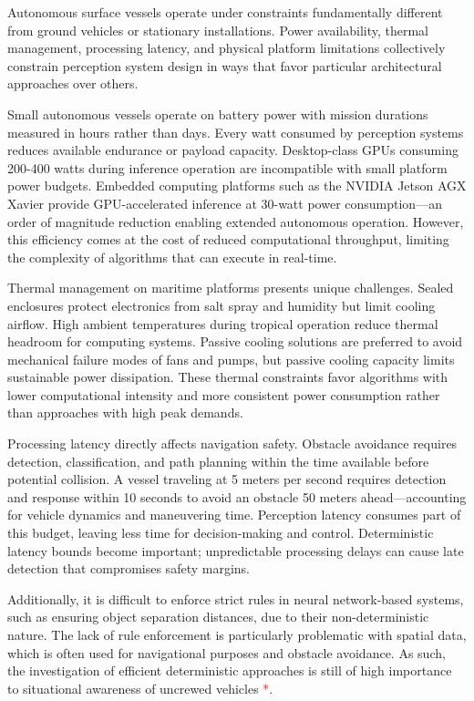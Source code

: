 \documentclass[../main.tex]{subfiles}
\begin{document}
Autonomous surface vessels operate under constraints fundamentally different from ground vehicles or stationary installations. Power availability, thermal management, processing latency, and physical platform limitations collectively constrain perception system design in ways that favor particular architectural approaches over others.

Small autonomous vessels operate on battery power with mission durations measured in hours rather than days. Every watt consumed by perception systems reduces available endurance or payload capacity. Desktop-class GPUs consuming 200-400 watts during inference operation are incompatible with small platform power budgets. Embedded computing platforms such as the NVIDIA Jetson AGX Xavier provide GPU-accelerated inference at 30-watt power consumption—an order of magnitude reduction enabling extended autonomous operation. However, this efficiency comes at the cost of reduced computational throughput, limiting the complexity of algorithms that can execute in real-time.

Thermal management on maritime platforms presents unique challenges. Sealed enclosures protect electronics from salt spray and humidity but limit cooling airflow. High ambient temperatures during tropical operation reduce thermal headroom for computing systems. Passive cooling solutions are preferred to avoid mechanical failure modes of fans and pumps, but passive cooling capacity limits sustainable power dissipation. These thermal constraints favor algorithms with lower computational intensity and more consistent power consumption rather than approaches with high peak demands.

Processing latency directly affects navigation safety. Obstacle avoidance requires detection, classification, and path planning within the time available before potential collision. A vessel traveling at 5 meters per second requires detection and response within 10 seconds to avoid an obstacle 50 meters ahead—accounting for vehicle dynamics and maneuvering time. Perception latency consumes part of this budget, leaving less time for decision-making and control. Deterministic latency bounds become important; unpredictable processing delays can cause late detection that compromises safety margins.

Additionally, it is difficult to enforce strict rules in neural network-based systems, such as ensuring object separation distances, due to their non-deterministic nature. The lack of rule enforcement is particularly problematic with spatial data, which is often used for navigational purposes and obstacle avoidance. As such, the investigation of efficient deterministic approaches is still of high importance to situational awareness of uncrewed vehicles \textcolor{red}{*}.
\end{document}
